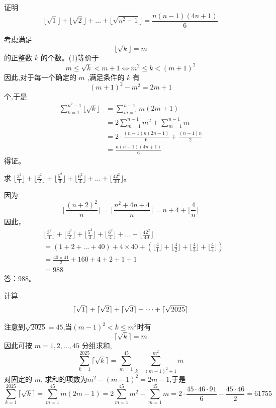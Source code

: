 \begin{questions}
    \question 证明 
    \[
    \lfloor \sqrt{1} \rfloor + \lfloor \sqrt{2} \rfloor + \dots + \lfloor \sqrt{n^2 - 1} \rfloor = \frac{n(n-1)(4n+1)}{6}
    \]
    \begin{solution}
        考虑满足 
        \[
        \lfloor \sqrt{k} \rfloor = m \tag{1}
        \]
        的正整数 $k$ 的个数。(1)等价于
        \[
        m \le \sqrt{k} < m+1 \Longleftrightarrow m^2 \le k < (m+1)^2 
        \]
        因此,对于每一个确定的 $m$ ,满足条件的 $k$ 有 
        \[
        (m+1)^2 - m^2 = 2m+1
        \]
        个,于是
        \begin{align}
        \sum_{k=1}^{n^2-1} \lfloor \sqrt{k} \rfloor &= \sum_{m=1}^{n-1} m(2m+1) \\
        &= 2 \sum_{m=1}^{n-1} m^2 + \sum_{m=1}^{n-1} m \\
        &= 2 \cdot \frac{(n-1)n(2n-1)}{6} + \frac{(n-1)n}{2} \\
        &= \frac{n(n-1)(4n+1)}{6}
        \end{align}
        得证。
    \end{solution}

    \question 求 $\lfloor \frac{3^2}{1} \rfloor + \lfloor \frac{4^2}{2} \rfloor + \lfloor \frac{5^2}{3} \rfloor + \lfloor \frac{6^2}{4} \rfloor + \dots + \lfloor \frac{42^2}{40} \rfloor$。

\begin{solution}
因为
\[
\lfloor \frac{(n+2)^2}{n} \rfloor = \lfloor \frac{n^2 + 4n + 4}{n} \rfloor = n + 4 + \lfloor \frac{4}{n} \rfloor
\]
因此，
\begin{align}
&\lfloor \frac{3^2}{1} \rfloor + \lfloor \frac{4^2}{2} \rfloor + \lfloor \frac{5^2}{3} \rfloor + \lfloor \frac{6^2}{4} \rfloor + \dots + \lfloor \frac{42^2}{40} \rfloor \\
&= (1 + 2 + \dots + 40) + 4 \times 40 + \left( \lfloor \frac{4}{1} \rfloor + \lfloor \frac{4}{2} \rfloor + \lfloor \frac{4}{3} \rfloor + \lfloor \frac{4}{4} \rfloor \right) \\
&= \frac{40 \times 41}{2} + 160 + 4 + 2 + 1 + 1 \\
&= 988
\end{align}
答：988。
\end{solution}

    \question 计算
    \[
    \lceil\sqrt{1}\rceil + \lceil\sqrt{2}\rceil + \lceil\sqrt{3}\rceil + \dots + \lceil\sqrt{2025}\rceil
    \]
    \begin{solution}
        注意到$\sqrt{2025}=45$,当$(m-1)^2<k\le m^2$时有
        \[
        \lceil \sqrt{k}\rceil=m
        \]
        因此可按 $m=1,2,\dots,45$ 分组求和,
        \[
        \sum_{k=1}^{2025}\lceil \sqrt{k}\rceil
        =\sum_{m=1}^{45}\sum_{k=(m-1)^2+1}^{m^2} m
        \]
        对固定的 $m$, 求和的项数为$m^2-(m-1)^2=2m-1$,于是
        \[
        \sum_{k=1}^{2025}\lceil \sqrt{k}\rceil
        =\sum_{m=1}^{45} m(2m-1)
        =2\sum_{m=1}^{45}m^2-\sum_{m=1}^{45}m
        =2\cdot\frac{45\cdot46\cdot91}{6}-\frac{45\cdot46}{2}
        =61755
        \]
    \end{solution}


\end{questions}
